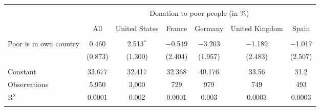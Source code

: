 
\begin{tabular}{@{\extracolsep{5pt}}lcccccc} 
\\[-1.8ex]\hline 
\hline \\[-1.8ex] 
 & \multicolumn{6}{c}{Donation to poor people (in \%)} \\ 
\cline{2-7} 
\\[-1.8ex] & All & United States & France & Germany & United Kingdom & Spain \\ 
\hline \\[-1.8ex] 
 Poor is in own country & 0.460 & 2.513$^{*}$ & $-$0.549 & $-$3.203 & $-$1.189 & $-$1.017 \\ 
  & (0.873) & (1.300) & (2.404) & (1.957) & (2.483) & (2.507) \\ 
 \hline \\[-1.8ex] 
Constant & 33.677 & 32.417 & 32.368 & 40.176 & 33.56 & 31.2 \\ 
Observations & 5,950 & 3,000 & 729 & 979 & 749 & 493 \\ 
R$^{2}$ & 0.0001 & 0.002 & 0.0001 & 0.003 & 0.0003 & 0.0003 \\ 
\hline 
\hline \\[-1.8ex] 
\end{tabular} 